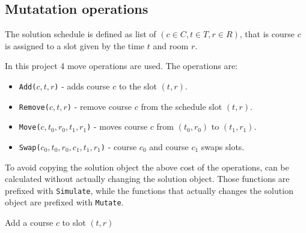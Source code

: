 \subsection{Mutatation operations}
\label{sec:mutate-operations}

The solution schedule is defined as list of $(c \in C, t \in T, r \in R)$, that is course $c$ is assigned to a slot given by the time $t$ and room $r$.

In this project 4 move operations are used. The operations are:
\begin{itemize}
\item \texttt{Add($c, t, r$)} - adds course $c$ to the slot $(t, r)$.  
\item \texttt{Remove($c, t, r$)} - remove course $c$ from the schedule slot $(t, r)$.
\item \texttt{Move($c, t_0, r_0, t_1, r_1$)} - moves course $c$ from $(t_0, r_0)$ to $(t_1, r_1)$.
\item \texttt{Swap($c_0, t_0, r_0, c_1, t_1, r_1$)} - course $c_0$ and course $c_1$ swaps slots.
\end{itemize}

To avoid copying the solution object the above cost of the operations, can be calculated without actually changing the solution object. Those functions are prefixed with \texttt{Simulate}, while the functions that actually changes the solution object are prefixed with \texttt{Mutate}.

\begin{algorithm}[H]
  \caption{Add a course $c$ to slot $(t, r)$}
  \begin{algorithmic}[1]
       
          \State {}
      \EndIf
      \State {} 
    \EndFunction
    
    \Statex
        \EndIf
    \EndFunction
  \end{algorithmic}
\end{algorithm}


